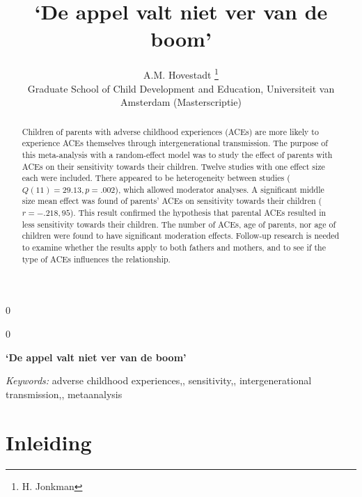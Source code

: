 \documentclass[12pt]{article}
\newcommand{\blind}{0}
\begin{document}
\def\spacingset#1{\renewcommand{\baselinestretch}%
{#1}\small\normalsize} \spacingset{1}



\blind
{
  \title{\bf `De appel valt niet ver van de boom'}

  \author{
        A.M. Hovestadt \thanks{H. Jonkman} \\
    Graduate School of Child Development and Education, Universiteit van
Amsterdam (Masterscriptie)\\
      }
  \maketitle
} \fi

\blind
{
  \bigskip
  \bigskip
  \bigskip
  \begin{center}
    {\LARGE\bf `De appel valt niet ver van de boom'}
  \end{center}
  \medskip
} \fi

\bigskip
\begin{abstract}
Children of parents with adverse childhood experiences (ACEs) are more
likely to experience ACEs themselves through intergenerational
transmission. The purpose of this meta-analysis with a random-effect
model was to study the effect of parents with ACEs on their sensitivity
towards their children. Twelve studies with one effect size each were
included. There appeared to be heterogeneity between studies
(\(Q (11) = 29.13, p = .002\)), which allowed moderator analyses. A
significant middle size mean effect was found of parents' ACEs on
sensitivity towards their children
(\(r = -.218, 95%
\)). This result confirmed the hypothesis that parental ACEs resulted in
less sensitivity towards their children. The number of ACEs, age of
parents, nor age of children were found to have significant moderation
effects. Follow-up research is needed to examine whether the results
apply to both fathers and mothers, and to see if the type of ACEs
influences the relationship.
\end{abstract}

\noindent%
{\it Keywords:} adverse childhood
experiences,, sensitivity,, intergenerational
transmission,, metaanalysis

\vfill

\newpage
\spacingset{1.9} %

\section{Inleiding}\label{inleiding}
\end{document}
